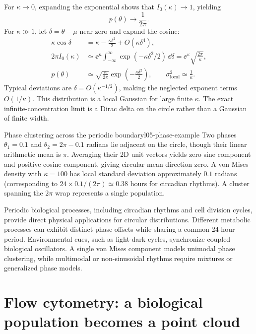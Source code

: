For $\kappa\to0$, expanding the exponential shows that $I_0(\kappa)\to1$, yielding
\begin{equation}
p(\theta)\longrightarrow\frac1{2\pi}.
\label{eq:l05-vonmises-uniform}
\end{equation}
For $\kappa\gg1$, let $\delta=\theta-\mu$ near zero and expand the cosine:
\begin{align}
\kappa\cos\delta
&=\kappa-\frac{\kappa\delta^2}{2}+O(\kappa\delta^4),\label{eq:l05-cos-expansion}\\
2\pi I_0(\kappa)
&\simeq\ee^\kappa\int_{-\infty}^{\infty}
\exp(-\kappa\delta^2/2)\,\dd\delta
=\ee^\kappa\sqrt{\frac{2\pi}{\kappa}},\label{eq:l05-bessel-asymptotic}\\
p(\theta)&\simeq\sqrt{\frac{\kappa}{2\pi}}
\exp\left(-\frac{\kappa\delta^2}{2}\right),
\qquad \sigma_{\mathrm{local}}^2\simeq\frac1\kappa.
\label{eq:l05-vonmises-normal}
\end{align}
Typical deviations are $\delta=O(\kappa^{-1/2})$, making the neglected exponent terms $O(1/\kappa)$. This distribution is a local Gaussian for large finite $\kappa$. The exact infinite-concentration limit is a Dirac delta on the circle rather than a Gaussian of finite width.

\begin{example}{Phase clustering across the periodic boundary}{l05-phase-example}
Two phases $\theta_1=0.1$ and $\theta_2=2\pi-0.1$ radians lie adjacent on the circle, though their linear arithmetic mean is $\pi$. Averaging their 2D unit vectors yields zero sine component and positive cosine component, giving circular mean direction zero. A von Mises density with $\kappa=100$ has local standard deviation approximately $0.1$ radians (corresponding to $24 \times 0.1 / (2\pi) \simeq 0.38$ hours for circadian rhythms). A cluster spanning the $2\pi$ wrap represents a single population.
\end{example}

Periodic biological processes, including circadian rhythms and cell division cycles, provide direct physical applications for circular distributions. Different metabolic processes can exhibit distinct phase offsets while sharing a common 24-hour period. Environmental cues, such as light-dark cycles, synchronize coupled biological oscillators. A single von Mises component models unimodal phase clustering, while multimodal or non-sinusoidal rhythms require mixtures or generalized phase models.

\section{Flow cytometry: a biological population becomes a point cloud}
\label{sec:l05-cytometry}
